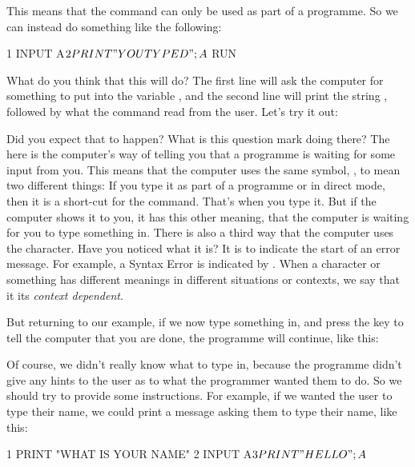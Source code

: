 
\needspace{4cm}
This means that the  command can only be used as part of a
programme.  So we can instead do something like the following:

\begin{screenoutput}
1 INPUT A$
2 PRINT "YOU TYPED "; A$
RUN
\end{screenoutput}

\needspace{4cm}
What do you think that this will do?  The first line will ask the
computer for something to put into the variable , and the
second line will print the string , followed by
what the  command read from the user.  Let's try it out:


Did you expect that to happen? What is this question mark doing there?
The  here is the computer's way of telling you that a
programme is waiting for some input from you.  This means that the
computer uses the same symbol, , to mean two different things:
If you type it as part of a programme or in direct mode, then it is a
short-cut for the  command. That's when you type it. But if
the computer shows it to you, it has this other meaning, that the
computer is waiting for you to type something in. There is also a
third way that the computer uses the  character. Have you
noticed what it is?  It is to indicate the start of an error
message. For example, a Syntax Error is indicated by . When a character or something has different meanings in
different situations or contexts, we say that it its {\em context
  dependent}.

\needspace{4cm}
But returning to our example,  if we now type
something in, and press the  key to tell the
computer that you are done, the programme will continue, like this:


\needspace{4cm}
Of course, we didn't really know what to type in, because the programme
didn't give any hints to the user as to what the programmer wanted
them to do. So we should try to provide some instructions.  For
example, if we wanted the user to type their name, we could print a
message asking them to type their name, like this:

\begin{screenoutput}
  1 PRINT "WHAT IS YOUR NAME"
  2 INPUT A$
  3 PRINT "HELLO "; A$
\end{screenoutput}


